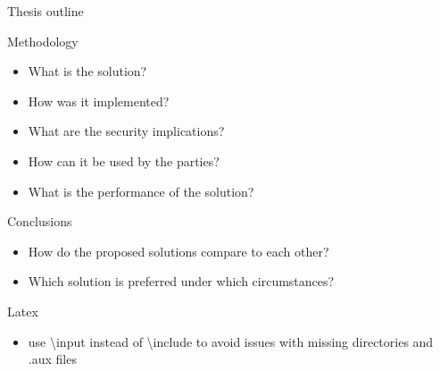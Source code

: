 \begin{frame}{Thesis outline}
\begin{block}{Methodology}
\begin{itemize}
  \begin{itemize}
  \tightlist
  \item
    What is the solution?
  \item
    How was it implemented?
  \item
    What are the security implications?
  \item
    How can it be used by the parties?
  \item
    What is the performance of the solution?
  \end{itemize}
\end{itemize}
\end{block}

\begin{block}{Conclusions}
\protect\hypertarget{conclusions}{}
\begin{itemize}
\tightlist
\item
  How do the proposed solutions compare to each other?
\item
  Which solution is preferred under which circumstances?
\end{itemize}
\end{block}
\end{frame}

\begin{frame}{Latex}
\protect\hypertarget{latex}{}
\begin{itemize}
\tightlist
\item
  use \textbackslash input instead of \textbackslash include to avoid
  issues with missing directories and .aux files
\end{itemize}
\end{frame}

